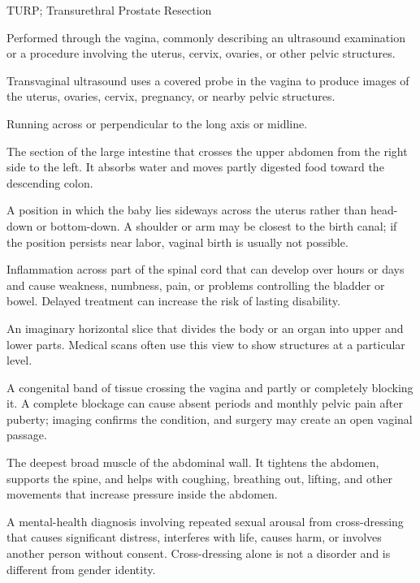 \synonyms
TURP; Transurethral Prostate Resection

 Performed through the vagina, commonly describing an ultrasound examination or a procedure involving the uterus, cervix, ovaries, or other pelvic structures.

 Transvaginal ultrasound uses a covered probe in the vagina to produce images of the uterus, ovaries, cervix, pregnancy, or nearby pelvic structures.

 Running across or perpendicular to the long axis or midline.

 The section of the large intestine that crosses the upper abdomen from the right side to the left. It absorbs water and moves partly digested food toward the descending colon.

 A position in which the baby lies sideways across the uterus rather than head-down or bottom-down. A shoulder or arm may be closest to the birth canal; if the position persists near labor, vaginal birth is usually not possible.

 Inflammation across part of the spinal cord that can develop over hours or days and cause weakness, numbness, pain, or problems controlling the bladder or bowel. Delayed treatment can increase the risk of lasting disability.

 An imaginary horizontal slice that divides the body or an organ into upper and lower parts. Medical scans often use this view to show structures at a particular level.

 A congenital band of tissue crossing the vagina and partly or completely blocking it. A complete blockage can cause absent periods and monthly pelvic pain after puberty; imaging confirms the condition, and surgery may create an open vaginal passage.

 The deepest broad muscle of the abdominal wall. It tightens the abdomen, supports the spine, and helps with coughing, breathing out, lifting, and other movements that increase pressure inside the abdomen.

 A mental-health diagnosis involving repeated sexual arousal from cross-dressing that causes significant distress, interferes with life, causes harm, or involves another person without consent. Cross-dressing alone is not a disorder and is different from gender identity.

